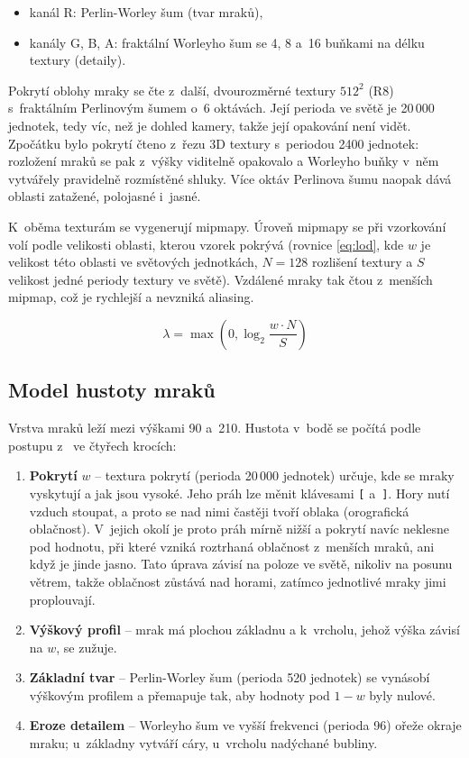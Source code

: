 \documentclass[a4paper, 12pt]{article}
\begin{document}
\begin{itemize}
  \item kanál R: Perlin-Worley šum (tvar mraků),
  \item kanály G, B, A: fraktální Worleyho šum se 4, 8 a~16 buňkami
    na délku textury (detaily).
\end{itemize}

Pokrytí oblohy mraky se čte z~další, dvourozměrné textury $512^2$ (R8)
s~fraktálním Perlinovým šumem o~6 oktávách. Její perioda ve světě je
20\,000 jednotek, tedy víc, než je dohled kamery, takže její opakování není
vidět. Zpočátku bylo pokrytí čteno z~řezu 3D textury s~periodou 2400 jednotek:
rozložení mraků se pak z~výšky viditelně opakovalo a Worleyho buňky v~něm
vytvářely pravidelně rozmístěné shluky. Více oktáv Perlinova šumu naopak dává
oblasti zatažené, polojasné i~jasné.

K~oběma texturám se vygenerují mipmapy. Úroveň mipmapy se při vzorkování volí podle
velikosti oblasti, kterou vzorek pokrývá (rovnice \ref{eq:lod}, kde $w$ je
velikost této oblasti ve světových jednotkách, $N = 128$ rozlišení textury
a $S$ velikost jedné periody textury ve světě). Vzdálené mraky tak čtou
z~menších mipmap, což je rychlejší a nevzniká aliasing.

\begin{equation}
  \lambda = \max\left(0, \log_2 \frac{w \cdot N}{S}\right)
  \label{eq:lod}
\end{equation}

\subsection{Model hustoty mraků}

Vrstva mraků leží mezi výškami 90 a~210. Hustota v~bodě se počítá podle
postupu z~\cite{schneider2015} ve čtyřech krocích:

\begin{enumerate}
  \item \textbf{Pokrytí} $w$ -- textura pokrytí (perioda 20\,000 jednotek)
    určuje, kde se mraky vyskytují a jak jsou vysoké. Jeho práh lze měnit
    klávesami \texttt{[} a~\texttt{]}. Hory nutí vzduch stoupat, a proto se
    nad nimi častěji tvoří oblaka (orografická oblačnost). V~jejich okolí
    je proto práh mírně nižší a pokrytí navíc neklesne pod hodnotu, při které
    vzniká roztrhaná oblačnost z~menších mraků, ani když je jinde jasno.
    Tato úprava závisí na poloze ve světě, nikoliv na posunu větrem, takže
    oblačnost zůstává nad horami, zatímco jednotlivé mraky jimi proplouvají.
  \item \textbf{Výškový profil} -- mrak má plochou základnu a k~vrcholu,
    jehož výška závisí na $w$, se zužuje.
  \item \textbf{Základní tvar} -- Perlin-Worley šum (perioda 520 jednotek) se
    vynásobí výškovým profilem a přemapuje tak, aby hodnoty pod $1 - w$ byly
    nulové.
  \item \textbf{Eroze detailem} -- Worleyho šum ve vyšší frekvenci (perioda 96)
    ořeže okraje mraku; u~základny vytváří cáry, u~vrcholu nadýchané bubliny.
\end{enumerate}
\end{document}
